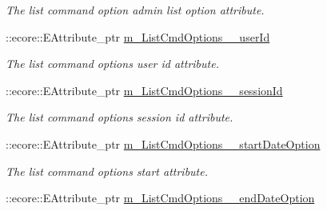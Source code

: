 \begin{DoxyCompactItemize}
\begin{DoxyCompactList}\small\item\em The list command option admin list option attribute. \item\end{DoxyCompactList}\item 
\hypertarget{classUMS__Data_1_1UMS__DataPackage_a2b67d383b8ff44f37145b75a9b3264b0}{
::ecore::EAttribute\_\-ptr \hyperlink{classUMS__Data_1_1UMS__DataPackage_a2b67d383b8ff44f37145b75a9b3264b0}{m\_\-ListCmdOptions\_\-\_\-userId}}
\label{classUMS__Data_1_1UMS__DataPackage_a2b67d383b8ff44f37145b75a9b3264b0}

\begin{DoxyCompactList}\small\item\em The list command options user id attribute. \item\end{DoxyCompactList}\item 
\hypertarget{classUMS__Data_1_1UMS__DataPackage_a857a7afaa97ae4d83c1569c030233574}{
::ecore::EAttribute\_\-ptr \hyperlink{classUMS__Data_1_1UMS__DataPackage_a857a7afaa97ae4d83c1569c030233574}{m\_\-ListCmdOptions\_\-\_\-sessionId}}
\label{classUMS__Data_1_1UMS__DataPackage_a857a7afaa97ae4d83c1569c030233574}

\begin{DoxyCompactList}\small\item\em The list command options session id attribute. \item\end{DoxyCompactList}\item 
\hypertarget{classUMS__Data_1_1UMS__DataPackage_afd994b27393010ce79d3acaae31b9557}{
::ecore::EAttribute\_\-ptr \hyperlink{classUMS__Data_1_1UMS__DataPackage_afd994b27393010ce79d3acaae31b9557}{m\_\-ListCmdOptions\_\-\_\-startDateOption}}
\label{classUMS__Data_1_1UMS__DataPackage_afd994b27393010ce79d3acaae31b9557}

\begin{DoxyCompactList}\small\item\em The list command options start attribute. \item\end{DoxyCompactList}\item 
\hypertarget{classUMS__Data_1_1UMS__DataPackage_a27cd5e0069fad20663c4145de57bd340}{
::ecore::EAttribute\_\-ptr \hyperlink{classUMS__Data_1_1UMS__DataPackage_a27cd5e0069fad20663c4145de57bd340}{m\_\-ListCmdOptions\_\-\_\-endDateOption}}
\label{classUMS__Data_1_1UMS__DataPackage_a27cd5e0069fad20663c4145de57bd340}


\end{DoxyCompactItemize}
